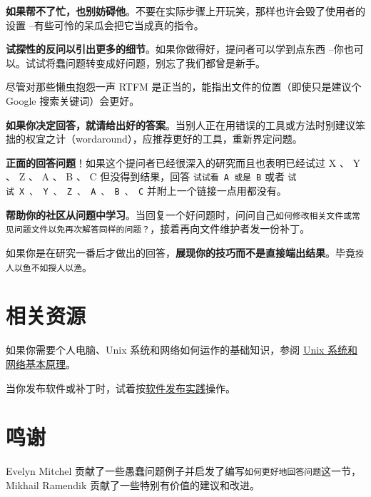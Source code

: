 \documentclass[titlepage]{article}
\begin{document}
\textbf{如果帮不了忙，也别妨碍他}。不要在实际步骤上开玩笑，那样也许会毁了使用者的设置
--有些可怜的呆瓜会把它当成真的指令。

\textbf{试探性的反问以引出更多的细节}。如果你做得好，提问者可以学到点东西
--你也可以。试试将蠢问题转变成好问题，别忘了我们都曾是新手。

尽管对那些懒虫抱怨一声 RTFM 是正当的，能指出文件的位置（即使只是建议个
Google 搜索关键词）会更好。

\textbf{如果你决定回答，就请给出好的答案}。当别人正在用错误的工具或方法时别建议笨拙的权宜之计（wordaround），应推荐更好的工具，重新界定问题。

\textbf{正面的回答问题}！如果这个提问者已经很深入的研究而且也表明已经试过
X 、 Y 、 Z 、 A 、 B 、 C 但没得到结果，回答
\texttt{试试看\ A\ 或是\ B} 或者
\texttt{试试\ X\ 、\ Y\ 、\ Z\ 、\ A\ 、\ B\ 、\ C}
并附上一个链接一点用都没有。

\textbf{帮助你的社区从问题中学习}。当回复一个好问题时，问问自己\texttt{如何修改相关文件或常见问题文件以免再次解答同样的问题？}，接着再向文件维护者发一份补丁。

如果你是在研究一番后才做出的回答，\textbf{展现你的技巧而不是直接端出结果}。毕竟\texttt{授人以鱼不如授人以渔}。

\hypertarget{ux76f8ux5173ux8d44ux6e90}{\section{相关资源}\label{ux76f8ux5173ux8d44ux6e90}}

如果你需要个人电脑、Unix 系统和网络如何运作的基础知识，参阅
\href{http://en.tldp.org/HOWTO/Unix-and-Internet-Fundamentals-HOWTO/}{Unix
系统和网络基本原理}。

当你发布软件或补丁时，试着按\href{http://en.tldp.org/HOWTO/Software-Release-Practice-HOWTO/index.html}{软件发布实践}操作。

\hypertarget{ux9e23ux8c22}{\section{鸣谢}\label{ux9e23ux8c22}}

Evelyn Mitchel
贡献了一些愚蠢问题例子并启发了编写\texttt{如何更好地回答问题}这一节，
Mikhail Ramendik 贡献了一些特别有价值的建议和改进。
\end{document}
